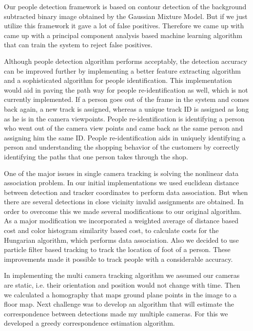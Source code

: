 \documentclass[12pt,a4paper]{report}
\begin{document}
\par Our people detection framework is based on contour detection of the background subtracted binary image obtained by the Gaussian Mixture Model. But if we just utilize this framework it gave a lot of false positives. Therefore we came up with came up with a principal component analysis based machine learning algorithm that can train the system to reject false positives.\\
\par Although people detection algorithm performs acceptably, the detection accuracy can be improved further by implementing a better feature extracting algorithm and a sophisticated algorithm for people identification. This implementation would aid in paving the path way for people re-identification as well, which is not currently implemented. If a person goes out of the frame in the system and comes back again, a new track is assigned, whereas a unique track ID is assigned as long as he is in the camera viewpoints. People re-identification is identifying a person who went out of the camera view points and came back as the same person and assigning him the same ID. People re-identification aids in uniquely identifying a person and understanding the shopping behavior of the customers by correctly identifying the paths that one person takes through the shop.\\
\par One of the major issues in single camera tracking is solving the nonlinear data association problem. In our initial implementations we used euclidean distance between detection and tracker coordinates to perform data association. But when there are several detections in close vicinity invalid assignments are obtained. In order to overcome this we made several modifications to our original algorithm. As a major modification we incorporated a weighted average of distance based cost and color histogram similarity based cost, to calculate costs for the Hungarian algorithm, which performs data association. Also we decided to use particle filter based tracking to track the location of foot of a person. These improvements made it possible to track people with a considerable accuracy.\\
\par In implementing the multi camera tracking algorithm we assumed our cameras are static, i.e. their orientation and position would not change with time. Then we calculated a homography that maps ground plane points in the image to a floor map. Next challenge was to develop an algorithm that will estimate the correspondence between detections made my multiple cameras. For this we developed a greedy correspondence estimation algorithm.\\
\end{document}

